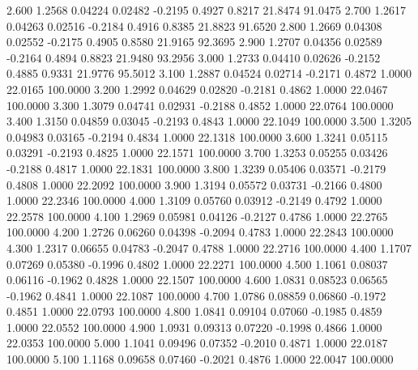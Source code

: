    2.600   1.2568   0.04224   0.02482  -0.2195   0.4927   0.8217  21.8474  91.0475
   2.700   1.2617   0.04263   0.02516  -0.2184   0.4916   0.8385  21.8823  91.6520
   2.800   1.2669   0.04308   0.02552  -0.2175   0.4905   0.8580  21.9165  92.3695
   2.900   1.2707   0.04356   0.02589  -0.2164   0.4894   0.8823  21.9480  93.2956
   3.000   1.2733   0.04410   0.02626  -0.2152   0.4885   0.9331  21.9776  95.5012
   3.100   1.2887   0.04524   0.02714  -0.2171   0.4872   1.0000  22.0165 100.0000
   3.200   1.2992   0.04629   0.02820  -0.2181   0.4862   1.0000  22.0467 100.0000
   3.300   1.3079   0.04741   0.02931  -0.2188   0.4852   1.0000  22.0764 100.0000
   3.400   1.3150   0.04859   0.03045  -0.2193   0.4843   1.0000  22.1049 100.0000
   3.500   1.3205   0.04983   0.03165  -0.2194   0.4834   1.0000  22.1318 100.0000
   3.600   1.3241   0.05115   0.03291  -0.2193   0.4825   1.0000  22.1571 100.0000
   3.700   1.3253   0.05255   0.03426  -0.2188   0.4817   1.0000  22.1831 100.0000
   3.800   1.3239   0.05406   0.03571  -0.2179   0.4808   1.0000  22.2092 100.0000
   3.900   1.3194   0.05572   0.03731  -0.2166   0.4800   1.0000  22.2346 100.0000
   4.000   1.3109   0.05760   0.03912  -0.2149   0.4792   1.0000  22.2578 100.0000
   4.100   1.2969   0.05981   0.04126  -0.2127   0.4786   1.0000  22.2765 100.0000
   4.200   1.2726   0.06260   0.04398  -0.2094   0.4783   1.0000  22.2843 100.0000
   4.300   1.2317   0.06655   0.04783  -0.2047   0.4788   1.0000  22.2716 100.0000
   4.400   1.1707   0.07269   0.05380  -0.1996   0.4802   1.0000  22.2271 100.0000
   4.500   1.1061   0.08037   0.06116  -0.1962   0.4828   1.0000  22.1507 100.0000
   4.600   1.0831   0.08523   0.06565  -0.1962   0.4841   1.0000  22.1087 100.0000
   4.700   1.0786   0.08859   0.06860  -0.1972   0.4851   1.0000  22.0793 100.0000
   4.800   1.0841   0.09104   0.07060  -0.1985   0.4859   1.0000  22.0552 100.0000
   4.900   1.0931   0.09313   0.07220  -0.1998   0.4866   1.0000  22.0353 100.0000
   5.000   1.1041   0.09496   0.07352  -0.2010   0.4871   1.0000  22.0187 100.0000
   5.100   1.1168   0.09658   0.07460  -0.2021   0.4876   1.0000  22.0047 100.0000
